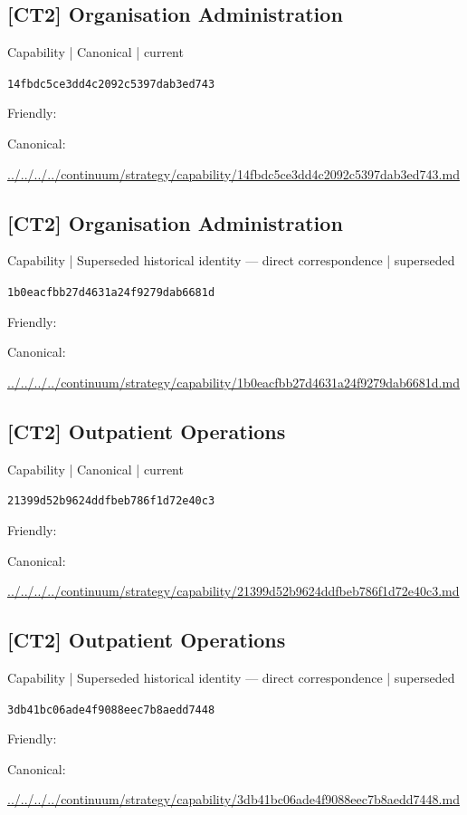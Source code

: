 \documentclass[10pt,a4paper]{article}
\begin{document}
\subsection*{[CT2] Organisation Administration}
{\small Capability | Canonical | current}\par
\texttt{14fbdc5ce3dd4c2092c5397dab3ed743}\par
Friendly: \par
Canonical: \par
{\footnotesize\url{../../../../continuum/strategy/capability/14fbdc5ce3dd4c2092c5397dab3ed743.md}}\par
\subsection*{[CT2] Organisation Administration}
{\small Capability | Superseded historical identity — direct correspondence | superseded}\par
\texttt{1b0eacfbb27d4631a24f9279dab6681d}\par
Friendly: \par
Canonical: \par
{\footnotesize\url{../../../../continuum/strategy/capability/1b0eacfbb27d4631a24f9279dab6681d.md}}\par
\subsection*{[CT2] Outpatient Operations}
{\small Capability | Canonical | current}\par
\texttt{21399d52b9624ddfbeb786f1d72e40c3}\par
Friendly: \par
Canonical: \par
{\footnotesize\url{../../../../continuum/strategy/capability/21399d52b9624ddfbeb786f1d72e40c3.md}}\par
\subsection*{[CT2] Outpatient Operations}
{\small Capability | Superseded historical identity — direct correspondence | superseded}\par
\texttt{3db41bc06ade4f9088eec7b8aedd7448}\par
Friendly: \par
Canonical: \par
{\footnotesize\url{../../../../continuum/strategy/capability/3db41bc06ade4f9088eec7b8aedd7448.md}}\par
\end{document}
